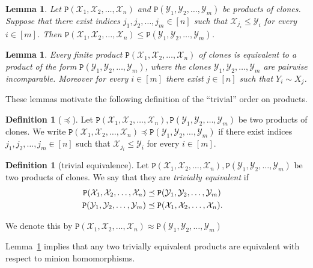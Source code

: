 \documentclass{amsart}
\numberwithin{equation}{section}
\theoremstyle{plain}
\newtheorem{lemma}[theorem]{Lemma}
\theoremstyle{definition}
\newtheorem{definition}[theorem]{Definition}
\def\clone#1{\mathcal{#1}}
\def\C#1{{\mathtt{P}}(#1)}
\begin{document}
\begin{lemma}
  \label{ineq-triv}
  Let $\C{\clone{X}_1,\clone{X}_2,\dots,\clone{X}_n}$ and $\C{\clone{Y}_1,\clone{Y}_2,\dots,\clone{Y}_m}$ be products of clones. Suppose that there exist indices $j_1,j_2,\dots,j_m\in[n]$ such that $\clone{X}_{j_i}\leq \clone{Y}_i$ for every $i\in[m]$. Then $\C{\clone{X}_1,\clone{X}_2,\dots,\clone{X}_n}\leq \C{\clone{Y}_1,\clone{Y}_2,\dots,\clone{Y}_m}$.
\end{lemma}

\begin{lemma}
  \label{incomparable-prod}
  Every finite product $\C{\clone{X}_1,\clone{X}_2,\dots,\clone{X}_n}$ of clones is equivalent to a product of the form $\C{\clone{Y}_1,\clone{Y}_2,\dots,\clone{Y}_m}$, where the clones $\clone{Y}_1, \clone{Y}_2, \dots, \clone{Y}_m$ are pairwise incomparable. Moreover for every $i\in[m]$ there exist $j\in[n]$ such that $Y_i\sim X_j$.
\end{lemma}

These lemmas motivate the following definition of the ``trivial'' order on products.

\begin{definition}[$\preceq$]
Let $\C{\clone{X}_1,\clone{X}_2,\dots,\clone{X}_n}, \C{\clone{Y}_1,\clone{Y}_2,\dots,\clone{Y}_m}$ be two products of clones. We write $\C{\clone{X}_1,\clone{X}_2,\dots,\clone{X}_n}\preceq \C{\clone{Y}_1,\clone{Y}_2,\dots,\clone{Y}_m}$ if there exist indices $j_1,j_2,\dots,j_m \in [n]$ such that $\clone{X}_{j_i}\leq \clone{Y}_i$ for every $i\in[m]$.
\end{definition}

\begin{definition}[trivial equivalence]
Let $\C{\clone{X}_1,\clone{X}_2,\dots,\clone{X}_n}, \C{\clone{Y}_1,\clone{Y}_2,\dots,\clone{Y}_m}$ be two products of clones. We say that they are {\em trivially equivalent} if
\begin{align}
\C{\clone{X}_1,\clone{X}_2,\dots,\clone{X}_n}&\preceq \C{\clone{Y}_1,\clone{Y}_2,\dots,\clone{Y}_m}\cr
\C{\clone{Y}_1,\clone{Y}_2,\dots,\clone{Y}_m}&\preceq \C{\clone{X}_1,\clone{X}_2,\dots,\clone{X}_n}.
\end{align}

We denote this by $\C{\clone{X}_1,\clone{X}_2,\dots,\clone{X}_n}\approx \C{\clone{Y}_1,\clone{Y}_2,\dots,\clone{Y}_m}$
\end{definition}

Lemma~\ref{ineq-triv} implies that any two trivially equivalent products are equivalent with respect to minion homomorphisms.
\end{document}
